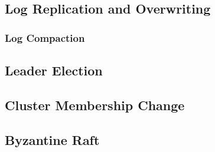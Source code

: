 \subsection{Log Replication and Overwriting}

\subsubsection{Log Compaction}

\subsection{Leader Election}

\subsection{Cluster Membership Change}

\subsection{Byzantine Raft}